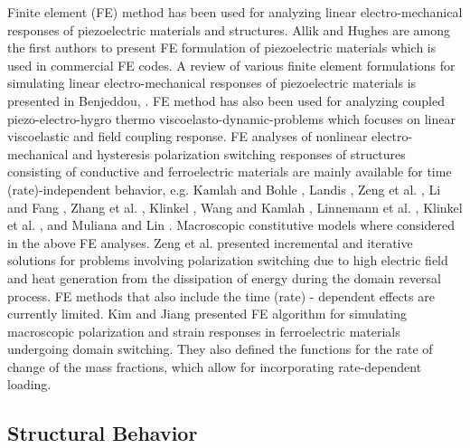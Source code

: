 Finite element (FE) method has been used for analyzing linear electro-mechanical responses of piezoelectric materials and structures. 
Allik and Hughes \cite{Allik1970} are among the first authors to present FE formulation of piezoelectric materials which is used in commercial FE codes. 
A review of various finite element formulations for simulating linear electro-mechanical responses of piezoelectric materials is presented in Benjeddou, \cite{Benjeddou2000}.
FE method has also been used for analyzing coupled  piezo-electro-hygro thermo viscoelasto-dynamic-problems \cite{Yi1999} which focuses on linear viscoelastic and field coupling response. 
FE analyses of nonlinear electro-mechanical and hysteresis polarization switching responses of structures consisting of conductive and ferroelectric materials are mainly available for time (rate)-independent behavior, e.g. Kamlah and Bohle \cite{Kamlah2001605}, Landis \cite{Landis2002}, Zeng et al. \cite{NME:NME556}, Li and Fang \cite{Li2004959}, Zhang et al. \cite{Zhang2005185}, Klinkel \cite{Klinkel20067197}, Wang and Kamlah \cite{0964-1726-18-10-104008}, Linnemann et al. \cite{Linnemann20091149}, Klinkel et al. \cite{Klinkel2006349}, and Muliana and Lin \cite{Muliana2011a}. 
Macroscopic constitutive models where considered in the above FE analyses.
Zeng et al. \cite{NME:NME556} presented incremental and iterative solutions for problems involving polarization switching due to high electric field and heat generation from the dissipation of energy during the domain reversal process. 
FE methods that also include the time (rate) - dependent effects are currently limited. 
Kim and Jiang \cite{Kim2002} presented FE algorithm for simulating macroscopic polarization and strain responses in ferroelectric materials undergoing domain switching. 
They also defined the functions for the rate of change of the mass fractions, which allow for incorporating rate-dependent loading.
\subsection{Structural Behavior}
